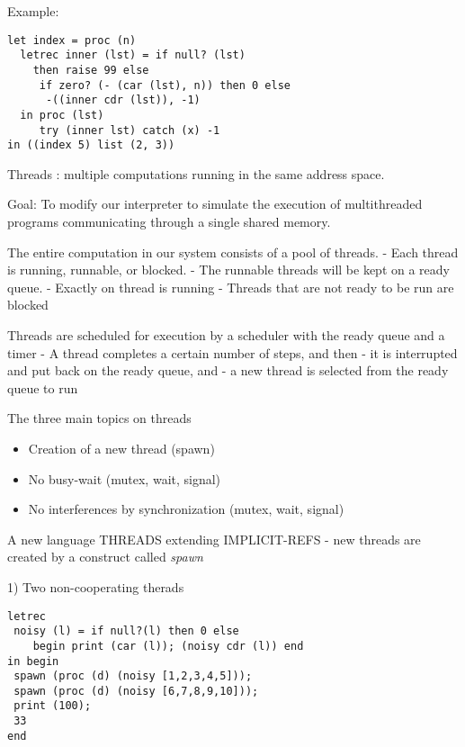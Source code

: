 \documentclass{article}
\begin{document}
\begin{huge}

Example:

\begin{lstlisting}
let index = proc (n) 
  letrec inner (lst) = if null? (lst)
    then raise 99 else
     if zero? (- (car (lst), n)) then 0 else 
      -((inner cdr (lst)), -1)
  in proc (lst)
     try (inner lst) catch (x) -1
in ((index 5) list (2, 3))
\end{lstlisting}


Threads : multiple computations running in the same address space. 

Goal: To modify our interpreter to simulate the execution of multithreaded programs communicating through a single shared memory.

The entire computation in our system consists of a pool of threads. \al
- Each thread is running, runnable, or blocked. \al
- The runnable threads will be kept on a ready queue. \al
- Exactly on thread is running \al
- Threads that are not ready to be run are blocked

Threads are scheduled for execution by a scheduler with the ready queue and a timer \al
- A thread completes a certain number of steps, and then \al
- it is interrupted and put back on the ready queue, and \al
- a new thread is selected from the ready queue to run


The three main topics on threads
\begin{itemize}
\item Creation of a new thread (spawn)
\item No busy-wait (mutex, wait, signal)
\item No interferences by synchronization (mutex, wait, signal)
\end{itemize}



A new language THREADS extending IMPLICIT-REFS \al
- new threads are created by a construct called {\it spawn}

1) Two non-cooperating therads
\begin{lstlisting}
letrec 
 noisy (l) = if null?(l) then 0 else 
    begin print (car (l)); (noisy cdr (l)) end
in begin
 spawn (proc (d) (noisy [1,2,3,4,5]));
 spawn (proc (d) (noisy [6,7,8,9,10]));
 print (100);
 33
end
\end{lstlisting}


\end{huge}
\end{document}
